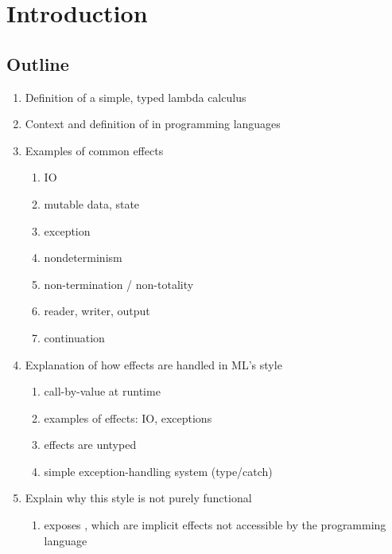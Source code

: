 \chapter{Introduction}

\section{Outline}

\begin{enumerate}
  \item Definition of a simple, typed lambda calculus
  \item Context and definition of  in programming languages
  \item Examples of common effects
  \begin{enumerate}
    \item IO
    \item mutable data, state
    \item exception
    \item nondeterminism
    \item non-termination / non-totality
    \item reader, writer, output
    \item continuation
  \end{enumerate}
  \item Explanation of how effects are handled in ML's style
  \begin{enumerate}
    \item call-by-value at runtime
    \item examples of effects: IO, exceptions
    \item effects are untyped
    \item simple exception-handling system (type/catch)
  \end{enumerate}
  \item Explain why this style is not purely functional
  \begin{enumerate}
    \item exposes , which are implicit effects not accessible by the programming language
  \end{enumerate}
\end{enumerate}
